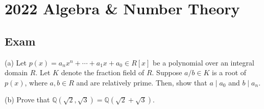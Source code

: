 \section{2022 Algebra \& Number Theory}

\subsection*{Exam}
\begin{exercise}
\label{algebra:2022:1}
(a) Let $p(x) = a_n x^n + \cdots + a_1 x + a_0 \in R[x]$ be a polynomial over an integral domain $R$. Let $K$ denote the fraction field of $R$. Suppose $a/b \in K$ is a root of $p(x)$, where $a, b \in R$ and are relatively prime. Then, show that $a \mid a_0$ and $b \mid a_n$.

(b) Prove that $\mathbb{Q}(\sqrt{2}, \sqrt{3}) = \mathbb{Q}(\sqrt{2} + \sqrt{3})$.
\end{exercise}

